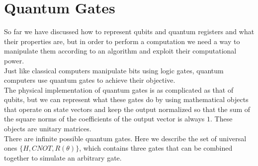 \documentclass[12pt,a4paper]{report}
\theoremstyle{definition}
\theoremstyle{definition}
\theoremstyle{definition}
\begin{document}
\section{Quantum Gates}
So far we have discussed how to represent qubits and quantum registers and what their properties are, but in order to perform a computation we need a way to manipulate them according to an algorithm and exploit their computational power.\\
Just like classical computers manipulate bits using logic gates, quantum computers use quantum gates to achieve their objective.\\
The physical implementation of quantum gates is as complicated as that of qubits, but we can represent what these gates do by using mathematical objects that operate on state vectors and keep the output normalized so that the sum of the square norms of the coefficients of the output vector is always $1$. These objects are unitary matrices.\\
There are infinite possible quantum gates. Here we describe the set of universal ones $\{H, CNOT, R(\theta)\}$, which contains three gates that can be combined together to simulate an arbitrary gate.\\
\end{document}
